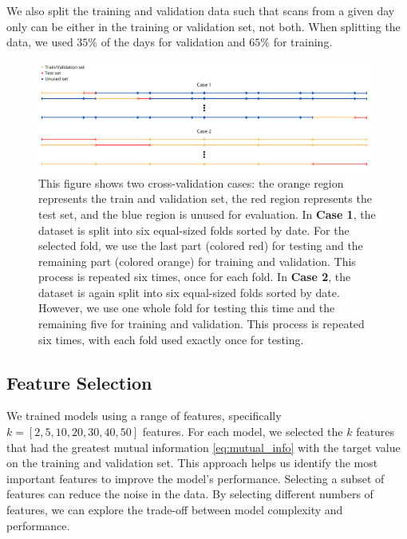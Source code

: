 We also split the training and validation data such that scans from a given day only can be either in the training or validation set, not both.
When splitting the data, we used $35\%$ of the days for validation and $65\%$ for training.


\begin{figure}[H]
    \centering
    \includegraphics[width=0.98\textwidth]{Canva/datasplits.png}
    \caption[Data split cases for pointing correction model]{This figure shows two cross-validation cases: the orange region represents the train and validation set, the red region represents the test set, and the blue region is unused for evaluation.
    In \textbf{Case 1}, the dataset is split into six equal-sized folds sorted by date.
    For the selected fold, we use the last part (colored red) for testing and the remaining part (colored orange) for training and validation.
    This process is repeated six times, once for each fold.
    In \textbf{Case 2}, the dataset is again split into six equal-sized folds sorted by date.
    However, we use one whole fold for testing this time and the remaining five for training and validation.
    This process is repeated six times, with each fold used exactly once for testing.}
    \label{fig:datasplit_cases}
\end{figure}




\subsection{Feature Selection}
We trained models using a range of features, specifically $k=[2,5,10,20,30,40,50]$ features.
For each model, we selected the $k$ features that had the greatest mutual information \eqref{eq:mutual_info} with the target value on the training and validation set.
This approach helps us identify the most important features to improve the model's performance. Selecting a subset of features can reduce the noise in the data. 
By selecting different numbers of features, we can explore the trade-off between model complexity and performance.

